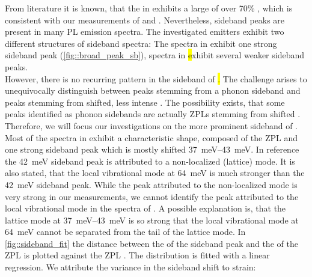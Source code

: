 		From literature it is known, that the \siv in \nd exhibits a large \db of over 70\% \cite{Neu2011,Neu2011b}, which is consistent with our measurements of \emnarrow and \embroad.
		Nevertheless, sideband peaks are present in many \siv PL emission spectra.
		The investigated emitters exhibit two different structures of sideband spectra: The spectra in \vl exhibit one strong sideband peak (\autoref{fig::broad_peak_sb}), spectra in \hl exhibit several weaker sideband peaks.
		\\
		However, there is no recurring pattern in the sideband of \hl.
		The challenge arises to unequivocally distinguish between peaks stemming from a phonon sideband and peaks stemming from shifted, less intense \siv \ZPLs.
		The possibility exists, that some peaks identified as phonon sidebands are actually ZPLs stemming from shifted \sivs. 
		Therefore, we will focus our investigations on the more prominent sideband of \vl.
		\\
		Most of the spectra in \vl exhibit a characteristic shape, composed of the ZPL and one strong sideband peak which is mostly shifted \SIrange{37}{43}{meV}. 
		In reference \cite{Dietrich2014} the \SI{42}{meV} sideband peak is attributed to a non-localized (lattice) mode. 
		It is also stated, that the local vibrational mode at \SI{64}{meV} is much stronger than the  \SI{42}{meV} sideband peak. 
		While the peak attributed to the non-localized mode is very strong in our measurements, we cannot identify the peak attributed to the local vibrational \siv mode in the spectra of \vl. 
		A possible explanation is, that the lattice mode at \SIrange{37}{43}{meV} is so strong that the local vibrational mode at \SI{64}{meV} cannot be separated from the tail of the lattice mode.
		In \autoref{fig::sideband_fit} the distance between the \cwl of the sideband peak and the \cwl of the ZPL is plotted against the ZPL \cwl. 
		The distribution is fitted with a linear regression.
		We attribute the variance in the sideband shift to strain: 
		\\
		\begin{figure}[tp]
			\begin{subfigure}[t]{ 0.49\linewidth}
				\centering
				\caption{}
				\label{subfig::sb_multfit_pos}
			\end{subfigure}
			\hfill
			\begin{subfigure}[t]{ 0.49\linewidth}
				\centering
				\caption{}
				\label{subfig::sb_multfit_width}
			\end{subfigure}
			\caption{}
			\label{fig::sb_multfit}
		\end{figure}
		